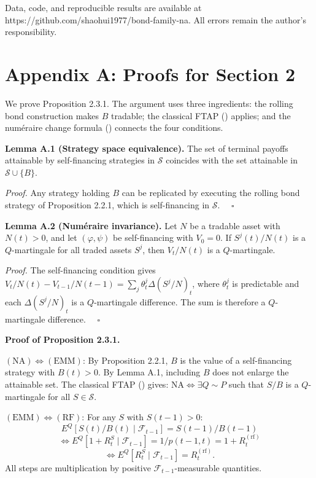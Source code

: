 \documentclass[
]{article}
\begin{document}
Data, code, and reproducible results are available at
https://github.com/shaohui1977/bond-family-na. All errors remain the
author's responsibility.

\section{Appendix A: Proofs for Section
2}\label{appendix-a-proofs-for-section-2}

We prove Proposition 2.3.1. The argument uses three ingredients: the
rolling bond construction makes \(B\) tradable; the classical FTAP
(\citealt{HarrisonPliska1981}) applies; and the numéraire change formula
(\citealt{GemanElKarouiRochet1995}) connects the four conditions.

\textbf{Lemma A.1 (Strategy space equivalence).} The set of terminal
payoffs attainable by self-financing strategies in \(\mathcal{S}\)
coincides with the set attainable in \(\mathcal{S} \cup \{B\}\).

\emph{Proof.} Any strategy holding \(B\) can be replicated by executing
the rolling bond strategy of Proposition 2.2.1, which is self-financing
in \(\mathcal{S}\). \(\quad\square\)

\textbf{Lemma A.2 (Numéraire invariance).} Let \(N\) be a tradable asset
with \(N(t) > 0\), and let \((\varphi, \psi)\) be self-financing with
\(V_0 = 0\). If \(S^j(t)/N(t)\) is a \(Q\)-martingale for all traded
assets \(S^j\), then \(V_t/N(t)\) is a \(Q\)-martingale.

\emph{Proof.} The self-financing condition gives
\(V_t/N(t) - V_{t-1}/N(t-1) = \sum_j \theta^j_t \Delta(S^j/N)_t\), where
\(\theta^j_t\) is predictable and each \(\Delta(S^j/N)_t\) is a
\(Q\)-martingale difference. The sum is therefore a \(Q\)-martingale
difference. \(\quad\square\)

\textbf{Proof of Proposition 2.3.1.}

\((\text{NA}) \iff (\text{EMM})\): By Proposition 2.2.1, \(B\) is the
value of a self-financing strategy with \(B(t) > 0\). By Lemma A.1,
including \(B\) does not enlarge the attainable set. The classical FTAP
(\citealt{HarrisonPliska1981}) gives: \(\text{NA} \iff \exists Q \sim P\)
such that \(S/B\) is a \(Q\)-martingale for all \(S \in \mathcal{S}\).

\((\text{EMM}) \iff (\text{RF})\): For any \(S\) with \(S(t-1) > 0\):
\[E^Q[S(t)/B(t) \mid \mathcal{F}_{t-1}] = S(t-1)/B(t-1)\]
\[\iff E^Q[1 + R_t^S \mid \mathcal{F}_{t-1}] = 1/p(t-1,t)
  = 1 + R_t^{(\text{rf})}\]
\[\iff E^Q[R_t^S \mid \mathcal{F}_{t-1}] = R_t^{(\text{rf})}.\] All
steps are multiplication by positive \(\mathcal{F}_{t-1}\)-measurable
quantities.
\end{document}
